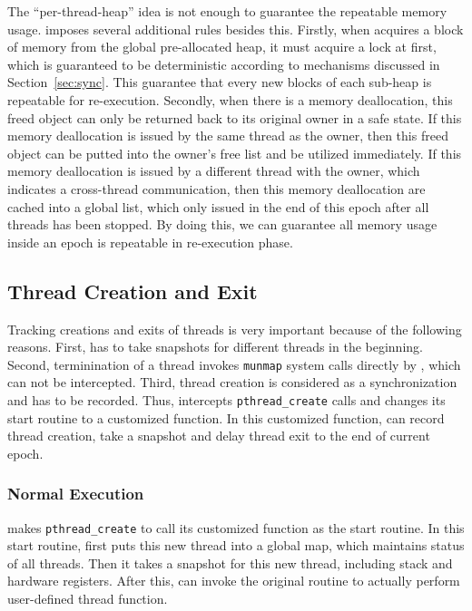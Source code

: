 The ``per-thread-heap'' idea is not enough to guarantee the repeatable memory usage. 
\doubletake{} imposes several additional rules besides this.
Firstly, when \doubletake{} acquires a block of memory from the global pre-allocated heap, it must 
acquire a lock at first, which is guaranteed to be deterministic according to mechanisms 
discussed in Section~\ref{sec:sync}.
This guarantee that every new blocks of each sub-heap is repeatable for re-execution. 
Secondly, when there is a memory deallocation, this freed object can only be returned back  
to its original owner in a safe state. 
If this memory deallocation is issued by the same thread as the owner, then this freed object
can be putted into the owner's free list and be utilized immediately. 
If this memory deallocation is issued by a different thread with the owner, 
which indicates a cross-thread communication,  
then this memory
deallocation are cached into a global list, which only issued in the end of this epoch after 
all threads has been stopped. 
By doing this, we can guarantee all memory usage inside an epoch is repeatable in re-execution phase.
 
\subsection{Thread Creation and Exit}
\label{sec:threadcreation}
Tracking creations and exits of threads is very important because of the following reasons.
First, \doubletake{} has to take snapshots for different threads in the beginning. 
Second, terminination of a thread invokes \texttt{munmap} system calls directly by \pthreads{}, which
can not be intercepted.  
Third, thread creation is considered as a synchronization and has to be recorded. 
Thus, \doubletake{} intercepts \texttt{pthread\_create} calls and changes its start routine 
to a customized function. 
In this customized function, \doubletake{} can record thread creation, take a snapshot and delay thread exit to the end of current epoch. 

\subsubsection{Normal Execution}

\doubletake{} makes \texttt{pthread\_create} to call its customized function as the start routine. 
In this start routine, \doubletake{} first puts this new thread into a global map, which maintains
status of all threads. 
Then it takes a snapshot for this new thread, including stack and hardware registers. 
After this, \doubletake{} can invoke the original routine to actually perform user-defined 
thread function. 

